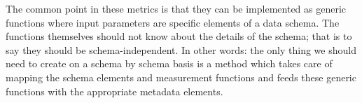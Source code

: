 The common point in these metrics is that they can be implemented as generic functions where input parameters are specific elements of a data schema. The functions themselves should not know about the details of the schema; that is to say they should be schema-independent. In other words: the only thing we should need to create on a schema by schema basis is a method which takes care of mapping the schema elements and measurement functions and feeds these generic functions with the appropriate metadata elements.
